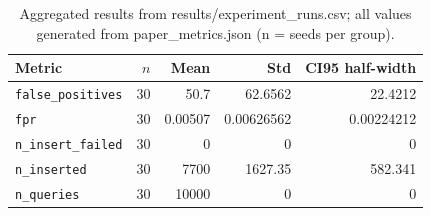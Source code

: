 
\begin{table}[htbp]
  \centering
  \caption{Aggregated results from results/experiment\_runs.csv; all values generated from paper_metrics.json (n = seeds per group).}
  \label{tab:experiment_runs}
  \begin{tabular}{lrrrr}
    \toprule
    Metric & $n$ & Mean & Std & CI95 half-width \\
    \midrule
    \texttt{false\_positives} & 30 & 50.7 & 62.6562 & 22.4212 \\
    \texttt{fpr} & 30 & 0.00507 & 0.00626562 & 0.00224212 \\
    \texttt{n\_insert\_failed} & 30 & 0 & 0 & 0 \\
    \texttt{n\_inserted} & 30 & 7700 & 1627.35 & 582.341 \\
    \texttt{n\_queries} & 30 & 10000 & 0 & 0 \\
    \bottomrule
  \end{tabular}
\end{table}
